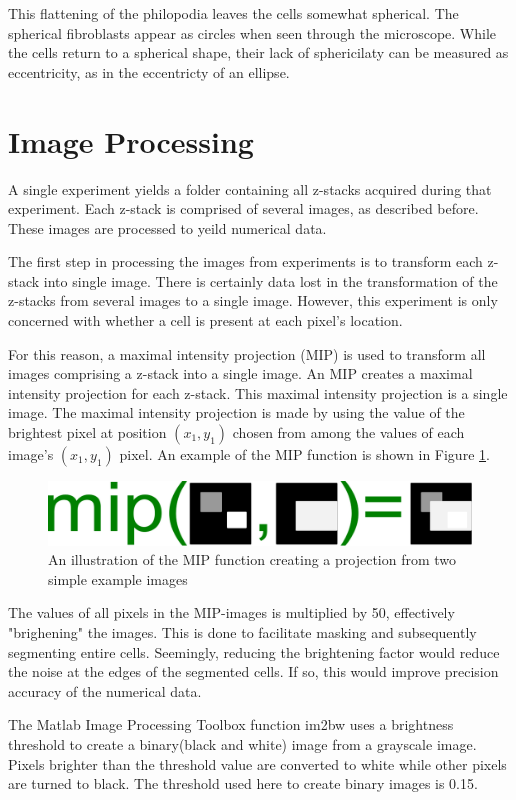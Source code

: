 \documentclass[ twocolumn,notitlepage]{ revtex4-1}
\begin{document}
This flattening of the philopodia leaves the cells somewhat spherical. The spherical fibroblasts appear as circles when seen through the microscope. While the cells return to a spherical shape, their lack of sphericilaty can be measured as eccentricity, as in the eccentricty of an ellipse.

\section*{Image Processing}
A single experiment yields a folder containing all z-stacks acquired during that experiment. Each z-stack is comprised of several images, as described before. These images are processed to yeild numerical data.

The first step in processing the images from experiments is to transform each z-stack into single image. There is certainly data lost in the transformation of the z-stacks from several images to a single image. However, this experiment is only concerned with whether a cell is present at each pixel's location.

For this reason, a maximal intensity projection (MIP) is used to transform all images comprising a z-stack into a single image. An MIP creates a maximal intensity projection for each z-stack. This maximal intensity projection is a single image. The maximal intensity projection is made by using the value of the brightest pixel at position $(x_1,y_1)$ chosen from among the values of each image's $(x_1,y_1)$ pixel. An example of the MIP function is shown in Figure \ref{fig:mip-illustration}.

\begin{figure}[!h]
\includegraphics[width=.4\textwidth]{./img/mip-illustration.pdf}
\caption{\label{fig:mip-illustration}An illustration of the MIP function creating a projection from two simple example images}
\end{figure}

The values of all pixels in the MIP-images is multiplied by 50, effectively "brighening" the images. This is done to facilitate masking and subsequently segmenting entire cells. Seemingly, reducing the brightening factor would reduce the noise at the edges of the segmented cells. If so, this would improve precision accuracy of the numerical data.

The Matlab Image Processing Toolbox function im2bw uses a brightness threshold to create a binary(black and white) image from a grayscale image. Pixels brighter than the threshold value are converted to white while other pixels are turned to black. The threshold used here to create binary images is 0.15.
\end{document}
